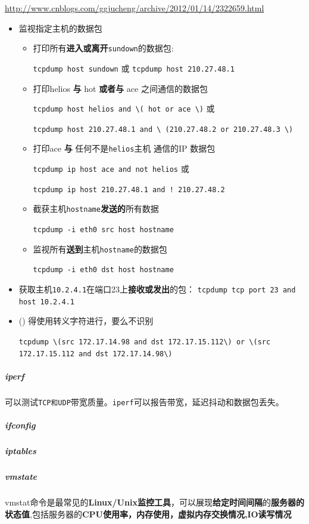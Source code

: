 \documentclass[UTF8,a4paper,12pt]{ctexbook}
\begin{document}
				\url{http://www.cnblogs.com/ggjucheng/archive/2012/01/14/2322659.html}
				\begin{itemize}[itemindent = 1em]
					\item 监视指定主机的数据包
						\begin{itemize}
							\item 打印所有\textbf{进入或离开}\verb|sundown|的数据包:
							
								\verb|tcpdump host sundown| 或 \verb|tcpdump host 210.27.48.1 |
							\item 打印helios \textbf{与} hot \textbf{或者与} ace 之间通信的数据包
							
								\verb|tcpdump host helios and \( hot or ace \)| 或 
								
							    \verb|tcpdump host 210.27.48.1 and \ (210.27.48.2 or 210.27.48.3 \)| 
							\item  打印ace \textbf{与} 任何不是\verb|helios|主机 通信的IP 数据包
							
								\verb|tcpdump ip host ace and not helios| 或 
								
								\verb|tcpdump ip host 210.27.48.1 and ! 210.27.48.2|
							\item 截获主机\verb|hostname|\textbf{发送的}所有数据
							
								\verb|tcpdump -i eth0 src host hostname|
							\item 监视所有\textbf{送到}主机\verb|hostname|的数据包
							
								\verb|tcpdump -i eth0 dst host hostname|
						\end{itemize}
						
					\item 获取主机\verb|10.2.4.1|在端口23上\textbf{接收或发出}的包：
							\verb|tcpdump tcp port 23 and host 10.2.4.1|
					
					\item  () 得使用转义字符进行，要么不识别
					
						\verb|tcpdump \(src 172.17.14.98 and dst 172.17.15.112\) or \(src 172.17.15.112 and dst 172.17.14.98\)|
				\end{itemize}
				
			\subparagraph{iperf}可以测试\verb|TCP和UDP|带宽质量。\verb|iperf|可以报告带宽，延迟抖动和数据包丢失。
			
			\subparagraph{ifconfig}
			
			\subparagraph{iptables}
			
			\subparagraph{vmstate} vmstat命令是最常见的\textbf{Linux/Unix监控工具}，可以展现\textbf{给定时间间隔}的\textbf{服务器的状态值},包括服务器的\textbf{CPU使用率，内存使用，虚拟内存交换情况,IO读写情况}
			
\end{document}
